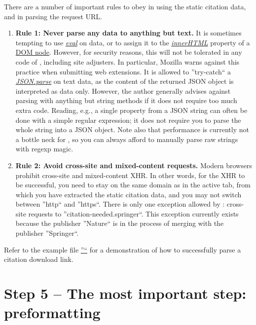 \documentclass[
a4paper,
12pt,
]
{article}
\begin{document}
There are a number of important rules to obey in using the static citation data, and in parsing the request URL.
\begin{enumerate}
 \item \textbf{Rule 1: Never parse any data to anything but text.} 
 It is sometimes tempting to use \href{https://en.wikipedia.org/wiki/XMLHttpRequest#The_open_method}{\textit{eval}} on data, or to assign it to the \href{https://developer.mozilla.org/en-US/docs/Web/API/Element/innerHTML}{\textit{innerHTML}} property of a \href{https://www.w3schools.com/jsref/dom_obj_attributes.asp}{DOM node}. However, for security reasons, this will not be tolerated in any code of {\plgname}, including site adjusters. In particular, Mozilla warns against this practice when submitting web extensions.
 It is allowed to ''try-catch`` a \href{https://www.w3schools.com/jsref/dom_obj_attributes.asp}{\textit{JSON.parse}} on text data, as the content of the returned JSON object is interpreted as data only. 
 However, the author generally advises against parsing with anything but string methods if it does not require too much extra code. Reading, e.g., a single property from a JSON string can often be done with a simple regular expression; it does not require you to parse the whole string into a JSON object. Note also that performance is currently not a bottle neck for {\plgname}, so you can always afford to manually parse raw strings with regexp magic.
 
 \item \textbf{Rule 2: Avoid cross-site and mixed-content requests.} Modern browsers prohibit cross-site and mixed-content XHR. In other words, for the XHR to be successful, you need to stay on the same domain as in the active tab, from which you have extracted the static citation data, and you may not switch between ''http`` and ''https``. There is only one exception allowed by {\plgname} : cross-site requests to ''citation-needed.springer``. This exception currently exists because the publisher ''Nature`` is in the process of merging with the publisher ''Springer``.
 
\end{enumerate}

Refer to the example file \href{https://github.com/Langenscheiss/bibitnow/blob/master/extractors/prefselectors/0_EXAMPLE.js}{''\exmpl``} for a demonstration of how to successfully parse a citation download link.

\section{Step 5 -- The most important step: preformatting}\label{sec_5}
\end{document}
